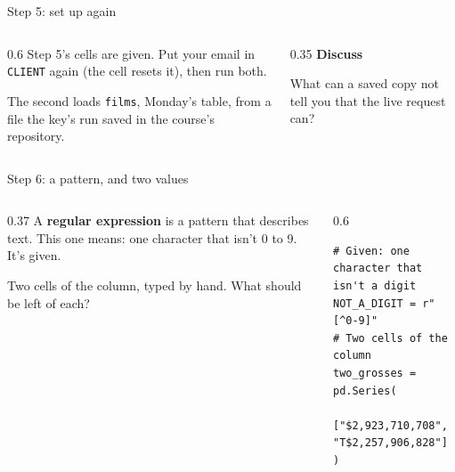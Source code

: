 \documentclass[9pt,aspectratio=169]{beamer}
\begin{document}
\begin{frame}{Step 5: set up again}
    \begin{columns}[T]
        \begin{column}{0.6\textwidth}
            Step 5's cells are given. Put your email in \texttt{CLIENT} again (the cell resets it), then run both.

            \medskip
            The second loads \texttt{films}, Monday's table, from a file the key's run saved in the course's repository.
        \end{column}
        \begin{column}{0.35\textwidth}
            \textbf{Discuss}\\[2pt]
            {\footnotesize What can a saved copy not tell you that the live request can?\par}
        \end{column}
    \end{columns}
\end{frame}

\begin{frame}[fragile]{Step 6: a pattern, and two values}
    \begin{columns}[T]
        \begin{column}{0.37\textwidth}
            A \textbf{regular expression} is a pattern that describes text. This one means: one character that isn't 0 to 9. It's given.

            \medskip
            Two cells of the column, typed by hand. What should be left of each?
        \end{column}
        \begin{column}{0.6\textwidth}
\begin{lstlisting}
# Given: one character that isn't a digit
NOT_A_DIGIT = r"[^0-9]"
# Two cells of the column
two_grosses = pd.Series(
    ["$2,923,710,708", "T$2,257,906,828"]
)
\end{lstlisting}
        \end{column}
    \end{columns}
\end{frame}
\end{document}
